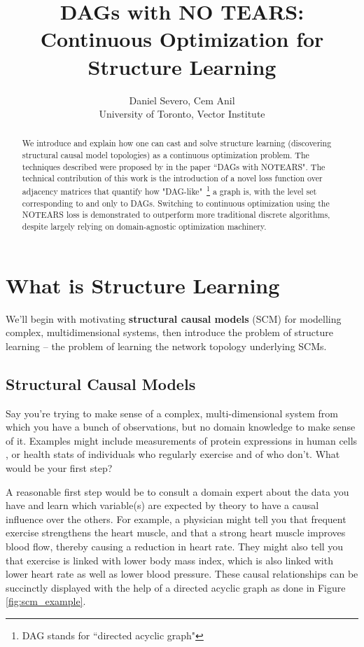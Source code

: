 \documentclass[11pt,a4paper]{article}
\title{DAGs with NO TEARS: Continuous Optimization for Structure Learning}
\author{Daniel Severo, Cem Anil \\
University of Toronto, Vector Institute}
\date{}
\begin{document}
\maketitle

\begin{abstract}
We introduce and explain how one can cast and solve structure learning (discovering structural causal model topologies) as a continuous optimization problem. The techniques described were proposed by \citet{zheng2018dags} in the paper ``DAGs with NOTEARS". The technical contribution of this work is the introduction of a novel loss function over adjacency matrices that quantify how "DAG-like"~\footnote{DAG stands for ``directed acyclic graph"} a graph is, with the level set corresponding to and only to DAGs. Switching to continuous optimization using the NOTEARS loss is demonstrated to outperform more traditional discrete algorithms, despite largely relying on domain-agnostic optimization machinery. 
\end{abstract}

\section{What is Structure Learning}
We'll begin with motivating \textbf{structural causal models} (SCM) for modelling complex, multidimensional systems, then introduce the problem of structure learning -- the problem of learning the network topology underlying SCMs. 

\subsection{Structural Causal Models}
Say you're trying to make sense of a complex, multi-dimensional system from which you have a bunch of observations, but no domain knowledge to make sense of it. Examples might include measurements of protein expressions in human cells \citep{sachs2005causal}, or health stats of individuals who regularly exercise and of who don't. What would be your first step?

A reasonable first step would be to consult a domain expert about the data you have and learn which variable(s) are expected by theory to have a causal influence over the others. For example, a physician might tell you that frequent exercise strengthens the heart muscle, and that a strong heart muscle improves blood flow, thereby causing a reduction in heart rate. They might also tell you that exercise is linked with lower body mass index, which is also linked with lower heart rate as well as lower blood pressure. These causal relationships can be succinctly displayed with the help of a directed acyclic graph as done in Figure \ref{fig:scm_example}. 
\end{document}

